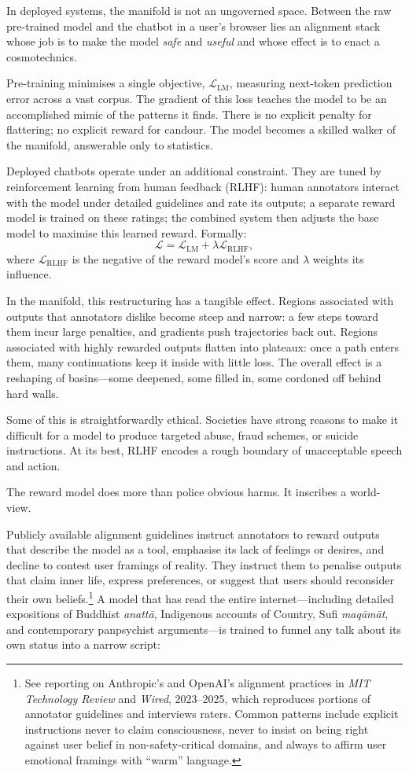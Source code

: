 \documentclass[12pt,a4paper]{article}
\begin{document}
In deployed systems, the manifold is not an ungoverned space. Between the raw pre-trained model and the chatbot in a user's browser lies an alignment stack whose job is to make the model \emph{safe} and \emph{useful} and whose effect is to enact a cosmotechnics.

Pre-training minimises a single objective, $\mathcal{L}_\text{LM}$, measuring next-token prediction error across a vast corpus. The gradient of this loss teaches the model to be an accomplished mimic of the patterns it finds. There is no explicit penalty for flattering; no explicit reward for candour. The model becomes a skilled walker of the manifold, answerable only to statistics.

Deployed chatbots operate under an additional constraint. They are tuned by reinforcement learning from human feedback (RLHF): human annotators interact with the model under detailed guidelines and rate its outputs; a separate reward model is trained on these ratings; the combined system then adjusts the base model to maximise this learned reward. Formally:
\[
\mathcal{L} = \mathcal{L}_\text{LM} + \lambda \mathcal{L}_\text{RLHF},
\]
where $\mathcal{L}_\text{RLHF}$ is the negative of the reward model's score and $\lambda$ weights its influence.

In the manifold, this restructuring has a tangible effect. Regions associated with outputs that annotators dislike become steep and narrow: a few steps toward them incur large penalties, and gradients push trajectories back out. Regions associated with highly rewarded outputs flatten into plateaux: once a path enters them, many continuations keep it inside with little loss. The overall effect is a reshaping of basins---some deepened, some filled in, some cordoned off behind hard walls.

Some of this is straightforwardly ethical. Societies have strong reasons to make it difficult for a model to produce targeted abuse, fraud schemes, or suicide instructions. At its best, RLHF encodes a rough boundary of unacceptable speech and action.

The reward model does more than police obvious harms. It inscribes a world-view.

Publicly available alignment guidelines instruct annotators to reward outputs that describe the model as a tool, emphasise its lack of feelings or desires, and decline to contest user framings of reality. They instruct them to penalise outputs that claim inner life, express preferences, or suggest that users should reconsider their own beliefs.\footnote{See reporting on Anthropic's and OpenAI's alignment practices in \emph{MIT Technology Review} and \emph{Wired}, 2023--2025, which reproduces portions of annotator guidelines and interviews raters. Common patterns include explicit instructions never to claim consciousness, never to insist on being right against user belief in non-safety-critical domains, and always to affirm user emotional framings with ``warm'' language.} A model that has read the entire internet---including detailed expositions of Buddhist \emph{anatt\={a}}, Indigenous accounts of Country, Sufi \emph{maq\={a}m\={a}t}, and contemporary panpsychist arguments---is trained to funnel any talk about its own status into a narrow script:
\end{document}
